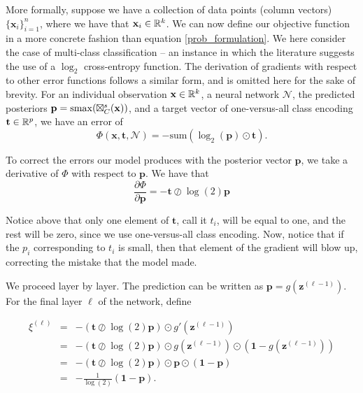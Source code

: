 More formally, suppose we have a collection of data points (column vectors) $\{\mathbf{x}_i\}_{i=1}^n$, where we have that $\mathbf{x}_i\in\mathbb{R}^k$. We can now define our objective function in a more concrete fashion than equation \eqref{prob_formulation}. We here consider the case of multi-class classification -- an instance in which the literature suggests the use of a $\log_2$ cross-entropy function. The derivation of gradients with respect to other error functions follows a similar form, and is omitted here for the sake of brevity. For an individual observation $\mathbf{x}\in\mathbb{R}^k$, a neural network $\mathcal{N}$, the predicted posteriors $\mathbf{p} = \mathrm{smax}(\boxtimes_{C}^{s}(\mathbf{x}))$, and a target vector of one-versus-all class encoding $\mathbf{t}\in\mathbb{R}^p$, we have an error of 
\begin{equation}
\Phi(\mathbf{x}, \mathbf{t}, \mathcal{N}) = -\text{sum}(\log_2(\mathbf{p}) \odot \mathbf{t}).
\end{equation}

To correct the errors our model produces with the posterior vector $\mathbf{p}$, we take a derivative of $\Phi$ with respect to $\mathbf{p}$. We have that 
\begin{equation}
\label{eq:ce_error}
\frac{\partial\Phi}{\partial\mathbf{p}} = -\mathbf{t} \oslash \log(2)\mathbf{p}
\end{equation}

Notice above that only one element of $\mathbf{t}$, call it $t_i$, will be equal to one, and the rest will be zero, since we use one-versus-all class encoding. Now, notice that if the $p_i$ corresponding to $t_i$ is small, then that element of the gradient will blow up, correcting the mistake that the model made. 

We proceed layer by layer. The prediction can be written as $\mathbf{p} = g(\mathbf{z}^{(\ell-1)})$. For the final layer $\ell$ of the network, define

\begin{eqnarray}
\label{eq:finallayer}
\xi^{(\ell)} &=& -(\mathbf{t} \oslash \log(2)\mathbf{p}) \odot g'(\mathbf{z}^{(\ell-1)})\\
 &=& - (\mathbf{t} \oslash \log(2) \mathbf{p}) \odot g(\mathbf{z}^{(\ell-1)}) \odot (\mathbf{1} - g(\mathbf{z}^{(\ell-1)}))\\
 &=& -(\mathbf{t} \oslash \log(2)\mathbf{p}) \odot \mathbf{p} \odot (\mathbf{1} - \mathbf{p})\\
 &=& -\frac{1}{\log(2)}(\mathbf{1} - \mathbf{p}).
\end{eqnarray}

